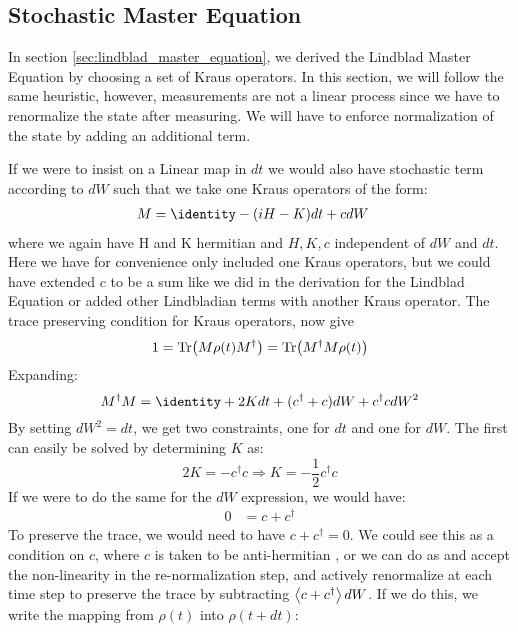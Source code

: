 \subsection{Stochastic Master Equation}
In section \ref{sec:lindblad_master_equation}, we derived the Lindblad Master Equation by choosing a set of Kraus operators. In this section, we will follow the same heuristic, however, measurements are not a linear process since we have to renormalize the state after measuring. We will have to enforce normalization of the state by adding an additional term.

If we were to insist on a Linear map in $dt$ we would also have stochastic term according to $dW$ such that we take one Kraus operators of the form:
\begin{align}
    M &=  \identity - (iH - K)dt + cdW
\end{align}
where we again have H and K hermitian and $H, K, c$ independent of $dW$ and $dt$. Here we have for convenience only included one Kraus operators, but we could have extended $c$ to be a sum like we did in the derivation for the Lindblad Equation or added other Lindbladian terms with another Kraus operator. The trace preserving condition for Kraus operators, now give
\begin{equation}
    1 = \Tr(M \rho(t) M^\dagger) = \Tr(M^\dagger M \rho(t))
\end{equation}
Expanding:
\begin{equation}\label{eq:trace_conservation}
    M^\dagger M  = \identity + 2K dt +  (c^\dagger + c)dW + c^\dagger c dW^2
\end{equation}
By setting $dW^2 = dt$, we get two constraints, one for $dt$ and one for $dW$. The first can easily be solved by determining $K$ as:
\begin{equation}
    2K = -c^\dagger c \Rightarrow K = -\frac12 c^\dagger c 
\end{equation}
If we were to do the same for the $dW$ expression, we would have:
\begin{align}
    0 &= c + c^\dagger
\end{align}
To preserve the trace, we would need to have $c + c^\dagger = 0$. We could see this as a condition on $c$, where $c$ is taken to be anti-hermitian \cite{adler_derivation_2000}, or we can do as \cite{jacobs_straightforward_2006} and accept the non-linearity in the re-normalization step, and actively renormalize at each time step to preserve the trace by subtracting $\expval{c + c^\dagger}dW$. If we do this, we  write the mapping from $\rho(t)$ into $\rho(t+dt)$:
